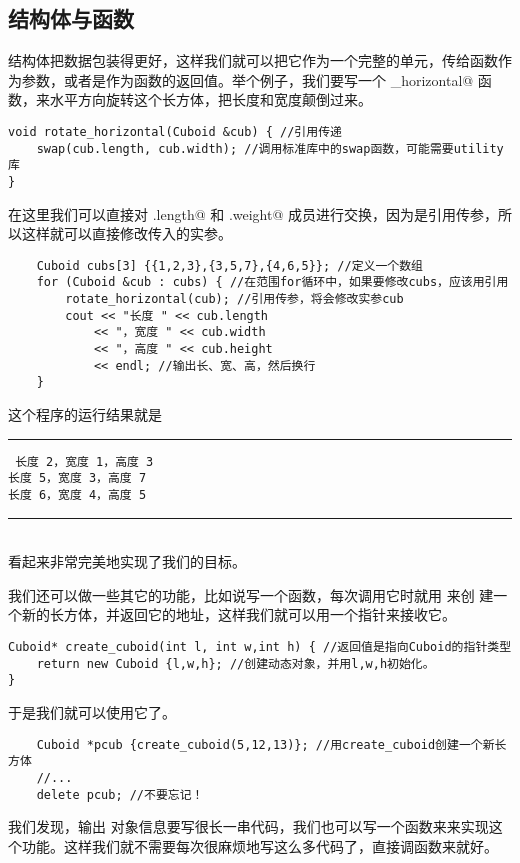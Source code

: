 \subsection*{结构体与函数}
结构体把数据包装得更好，这样我们就可以把它作为一个完整的单元，传给函数作为参数，或者是作为函数的返回值。举个例子，我们要写一个 \lstinline@rotate_horizontal@ 函数，来水平方向旋转这个长方体，把长度和宽度颠倒过来。
\begin{lstlisting}
void rotate_horizontal(Cuboid &cub) { //引用传递
    swap(cub.length, cub.width); //调用标准库中的swap函数，可能需要utility库
}
\end{lstlisting}
在这里我们可以直接对 \lstinline@cub.length@ 和 \lstinline@cub.weight@ 成员进行交换，因为是引用传参，所以这样就可以直接修改传入的实参。\par
\begin{lstlisting}
    Cuboid cubs[3] {{1,2,3},{3,5,7},{4,6,5}}; //定义一个数组
    for (Cuboid &cub : cubs) { //在范围for循环中，如果要修改cubs，应该用引用
        rotate_horizontal(cub); //引用传参，将会修改实参cub
        cout << "长度 " << cub.length
            << "，宽度 " << cub.width
            << "，高度 " << cub.height
            << endl; //输出长、宽、高，然后换行
    }
\end{lstlisting}
这个程序的运行结果就是\\\noindent\rule{\linewidth}{.2pt}\texttt{
长度 2，宽度 1，高度 3\\
长度 5，宽度 3，高度 7\\
长度 6，宽度 4，高度 5
}\\\noindent\rule{\linewidth}{.2pt}\\
看起来非常完美地实现了我们的目标。\par
我们还可以做一些其它的功能，比如说写一个函数，每次调用它时就用 \lstinline@new@ 来创 建一个新的长方体，并返回它的地址，这样我们就可以用一个指针来接收它。
\begin{lstlisting}
Cuboid* create_cuboid(int l, int w,int h) { //返回值是指向Cuboid的指针类型
    return new Cuboid {l,w,h}; //创建动态对象，并用l,w,h初始化。
}
\end{lstlisting}
于是我们就可以使用它了。
\begin{lstlisting}
    Cuboid *pcub {create_cuboid(5,12,13)}; //用create_cuboid创建一个新长方体
    //...
    delete pcub; //不要忘记！
\end{lstlisting}\par
我们发现，输出 \lstinline@Cuboid@ 对象信息要写很长一串代码，我们也可以写一个函数来来实现这个功能。这样我们就不需要每次很麻烦地写这么多代码了，直接调函数来就好。
